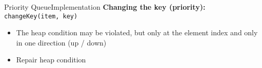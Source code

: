 \begin{frame}{Priority Queue}{Implementation}
  \textbf{Changing the key (priority):}
  {\color{Mittel-Blau}\texttt{changeKey(item, key)}}
  \begin{itemize}
    \item
      The {\color{Mittel-Blau}heap condition} may be violated, but only at the
      element index and only in one direction (up / down)
    \item
      Repair {\color{Mittel-Blau}heap condition}
  \end{itemize}
    \begin{figure}[!h]
      \begin{adjustbox}{height=0.275\linewidth}
      \end{adjustbox}
      \hspace{0.25em}\hspace{-1.5em}
      \begin{adjustbox}{height=0.275\linewidth}
      \end{adjustbox}
      \label{fig:priority_queue:impl_change_key2}%
    \end{figure}%
\end{frame}


